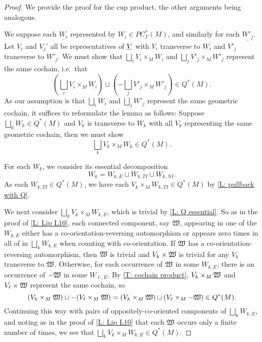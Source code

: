 \begin{proof}
	We provide the proof for the cup product, the other arguments being analogous.

	We suppose each $\underline{W_i}$ represented by $W_i \in PC^*_\Gamma(M)$, and similarly for each $\underline{W'_j}$.
	Let $V_i$ and $V_j'$ all be representatives of $\underline{V}$ with $V_i$ transverse to $W_i$ and $V'_j$ transverse to $W'_j$.
	We must show that $\bigsqcup_i V_i \times_M W_i$ and $\bigsqcup_j V'_j \times_M W'_j$ represent the same cochain, i.e.\ that $$\left(\bigsqcup_i V_i \times_M W_i\right) \sqcup \left(-\bigsqcup_j V'_j \times_M W'_j\right) \in Q^*(M).$$
	As our assumption is that $\bigsqcup_i W_i$ and $\bigsqcup_j W'_j$ represent the same geometric cochain, it suffices to reformulate the lemma as follows: Suppose $\bigsqcup_k W_k \in Q^*(M)$ and $V_k$ is transverse to $W_k$ with all $V_k$ representing the same geometric cochain, then we must show
	$$\bigsqcup_k V_k \times_M W_k \in Q^*(M).$$

	For each $W_k$, we consider its essential decomposition $$W_k = W_{k,E} \sqcup W_{k,TI} \sqcup W_{k,NI}.$$
	As each $W_{k,TI} \in Q^*(M)$, we have each $V_k \times_M W_{k,TI} \in Q^*(M)$ by \cref{L: pullback with Q}.

	We next consider $\bigsqcup_k V_k \times_M W_{k,E}$, which is trivial by \cref{L: Q essential}.
	So as in the proof of \cref{L: Lip L10}, each connected component, say $\mathfrak W$, appearing in one of the $W_{k,E}$ either has a co-orientation-reversing automorphism or appears zero times in all of in $\bigsqcup_k W_{k,E}$ when counting with co-orientation.
	If $\mathfrak W$ has a co-orientation-reversing automorphism, then $\mathfrak W$ is trivial and $V_k \times \mathfrak W$ is trivial for any $V_k$ transverse to $\mathfrak W$.
	Otherwise, for each occurrence of $\mathfrak W$ in some $W_{k,E}$, there is an occurrence of $-\mathfrak W$ in some $W_{\ell,E}$.
	By \cref{T: cochain product}, $V_k \times_M \mathfrak W$ and $V_\ell \times \mathfrak W$ represent the same cochain, so
	$$(V_k \times_M \mathfrak W) \sqcup -(V_\ell \times_M \mathfrak W) = (V_k \times_M \mathfrak W)\sqcup(V_\ell \times_M -\mathfrak W) \in Q^*(M).$$
	Continuing this way with pairs of oppositely-co-oriented components of $\bigsqcup_k W_{k,E}$, and noting as in the proof of \cref{L: Lip L10} that each $\mathfrak W$ occurs only a finite number of times, we see that $\bigsqcup_k V_k \times_M W_{k,E} \in Q^*(M)$.


\end{proof}
